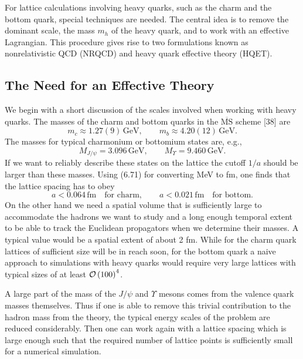 For lattice calculations involving heavy quarks, such as the charm and the
bottom quark, special techniques are needed. The central idea is to remove the
dominant scale, the mass $m_h$ of the heavy quark, and to work with an
effective Lagrangian. This procedure gives rise to two formulations known as
nonrelativistic QCD (NRQCD) and heavy quark effective theory (HQET).

\subsection{The Need for an Effective Theory}

We begin with a short discussion of the scales involved when working with
heavy quarks. The masses of the charm and bottom quarks in the
$\overline{\mathrm{MS}}$ scheme [38] are
\begin{equation}
  m_c \approx 1.27(9)\,\mathrm{GeV} , \qquad
  m_b \approx 4.20(12)\,\mathrm{GeV} .
\end{equation}
The masses for typical charmonium or bottomium states are, e.g.,
\begin{equation}
  M_{J/\psi} = 3.096\,\mathrm{GeV} , \qquad
  M_{\Upsilon} = 9.460\,\mathrm{GeV} .
\end{equation}
If we want to reliably describe these states on the lattice the cutoff $1/a$
should be larger than these masses. Using (6.71) for converting MeV to fm, one
finds that the lattice spacing has to obey
\begin{equation}
  a < 0.064\,\mathrm{fm} \quad \text{for charm} , \qquad
  a < 0.021\,\mathrm{fm} \quad \text{for bottom} .
\end{equation}
On the other hand we need a spatial volume that is sufficiently large to
accommodate the hadrons we want to study and a long enough temporal extent to
be able to track the Euclidean propagators when we determine their masses. A
typical value would be a spatial extent of about 2 fm. While for the charm
quark lattices of sufficient size will be in reach soon, for the bottom quark
a naive approach to simulations with heavy quarks would require very large
lattices with typical sizes of at least $\mathcal{O}\left(100\right)^4$.

A large part of the mass of the $J/\psi$ and $\Upsilon$ mesons comes from the
valence quark masses themselves. Thus if one is able to remove this trivial
contribution to the hadron mass from the theory, the typical energy scales of
the problem are reduced considerably. Then one can work again with a lattice
spacing which is large enough such that the required number of lattice points
is sufficiently small for a numerical simulation.

